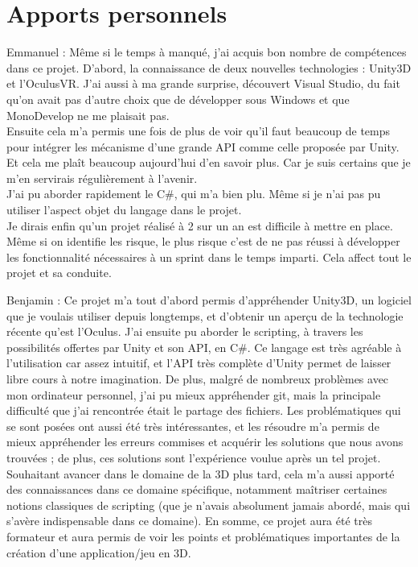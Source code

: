 \documentclass[a4paper,11pt]{myreport}
\begin{document}
\chapter{Apports personnels}
\par Emmanuel : Même si le temps à manqué, j'ai acquis bon nombre de compétences dans ce projet. D'abord, la connaissance de deux nouvelles technologies : Unity3D et l'OculusVR. J'ai aussi à ma grande surprise, découvert Visual Studio, du fait qu'on avait pas d'autre choix que de développer sous Windows et que MonoDevelop ne me plaisait pas.\\
Ensuite cela m'a permis une fois de plus de voir qu'il faut beaucoup de temps pour intégrer les mécanisme d'une grande API comme celle proposée par Unity. Et cela me plaît beaucoup aujourd'hui d'en savoir plus. Car je suis certains que je m'en servirais régulièrement à l'avenir.\\
J'ai pu aborder rapidement le C\#, qui m'a bien plu. Même si je n'ai pas pu utiliser l'aspect objet du langage dans le projet.\\
Je dirais enfin qu'un projet réalisé à 2 sur un an est difficile à mettre en place. Même si on identifie les risque, le plus risque c'est de ne pas réussi à développer les fonctionnalité nécessaires à un sprint dans le temps imparti. Cela affect tout le projet et sa conduite.
\par Benjamin : Ce projet m'a tout d'abord permis d'appréhender Unity3D, un logiciel que je voulais utiliser depuis longtemps, et d'obtenir un aperçu de la technologie récente qu'est l'Oculus. J'ai ensuite pu aborder le scripting, à travers les possibilités offertes par Unity et son API, en C\#. Ce langage est très agréable à l'utilisation car assez intuitif, et l'API très complète d'Unity permet de laisser libre cours à notre imagination.
De plus, malgré de nombreux problèmes avec mon ordinateur personnel, j'ai pu mieux appréhender git, mais la principale difficulté que j'ai rencontrée était le partage des fichiers.
Les problématiques qui se sont posées ont aussi été très intéressantes, et les résoudre m'a permis de mieux appréhender les erreurs commises et acquérir les solutions que nous avons trouvées ; de plus, ces solutions sont l'expérience voulue après un tel projet.
Souhaitant avancer dans le domaine de la 3D plus tard, cela m'a aussi apporté des connaissances dans ce domaine spécifique, notamment maîtriser certaines notions classiques de scripting (que je n'avais absolument jamais abordé, mais qui s'avère indispensable dans ce domaine).
En somme, ce projet aura été très formateur et aura permis de voir les points et problématiques importantes de la création d'une application/jeu en 3D.

\listoffigures
\end{document}
